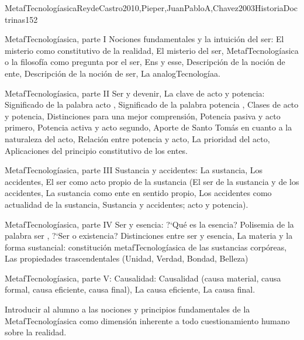 \begin{syllabus}
\begin{unit}{MetafTecnologíasica}{ReydeCastro2010,Pieper,JuanPabloA,Chavez2003HistoriaDoctrinas}{15}{2}
\begin{topics}
	\item MetafTecnologíasica, parte I  Nociones fundamentales y la intuición del ser: El misterio como constitutivo de la realidad, El misterio del ser, MetafTecnologíasica o la filosofía como pregunta por el ser, Ens y esse, Descripción de la noción de ente, Descripción de la noción de ser, La analogTecnologíaa.
	\item MetafTecnologíasica, parte II  Ser y devenir, La clave de acto y potencia: Significado de la palabra  acto , Significado de la palabra  potencia , Clases de acto y potencia, Distinciones para una mejor comprensión, Potencia pasiva y acto primero, Potencia activa y acto segundo, Aporte de Santo Tomás en cuanto a la naturaleza del acto, Relación entre potencia y acto, La prioridad del acto, Aplicaciones del principio constitutivo de los entes.
	\item MetafTecnologíasica, parte III  Sustancia y accidentes: La sustancia, Los accidentes, El ser como acto propio de la sustancia (El ser de la sustancia y de los accidentes, La sustancia como ente en sentido propio, Los accidentes como actualidad de la sustancia, Sustancia y accidentes; acto y potencia).
	\item MetafTecnologíasica, parte IV  Ser y esencia: ?`Qué es la esencia? Polisemia de la palabra  ser , ?`Ser o existencia? Distinciones entre ser y esencia, La materia y la forma sustancial: constitución metafTecnologíasica de las sustancias corpóreas, Las propiedades trascendentales (Unidad, Verdad, Bondad, Belleza)
	\item MetafTecnologíasica, parte V: Causalidad: Causalidad (causa material, causa formal, causa eficiente, causa final), La causa eficiente, La causa final.
\end{topics}

\begin{unitgoals}
	\item Introducir al alumno a las nociones y principios fundamentales de la MetafTecnologíasica como dimensión inherente a todo cuestionamiento humano sobre la realidad.
\end{unitgoals}
\end{unit}



\begin{coursebibliography}
\end{coursebibliography}

\end{syllabus}
